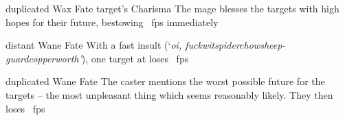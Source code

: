   {duplicated}%
  {Wax}%
  {Fate}%
  {target's Charisma}%
  {The mage blesses the targets with high hopes for their future, bestowing \showDam~\glspl{fp} immediately}%
  {}

  {distant}%
  {Wane}%
  {Fate}%
  {}%
  {With a fast insult (`\textit{oi, \ifcase\value{r4}fuckwit\or spiderchow\or sheep-guard\else copperworth\fi'}), one target at \spellRange{} loses \showDam~\glspl{fp}}%
  {}

  {duplicated}%
  {Wane}%
  {Fate}%
  {}%
  {The caster mentions the worst possible future for the targets -- the most unpleasant thing which seems reasonably likely.
    They then loses \showDam~\glspl{fp}}%
  {}

